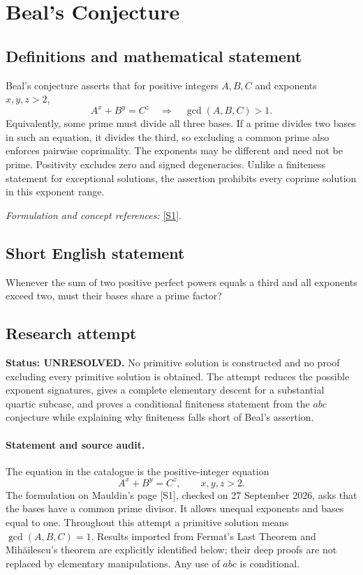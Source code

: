 \documentclass[11pt]{article}
\begin{document}
\section*{\texorpdfstring{Beal's Conjecture}{Beal's Conjecture}}\label{statement}
\subsection{Definitions and mathematical statement}
Beal's conjecture asserts that for positive integers $A,B,C$ and exponents $x,y,z>2$,
\[
 A^x+B^y=C^z\quad\Longrightarrow\quad\gcd(A,B,C)>1.
\]
Equivalently, some prime must divide all three bases. If a prime divides two bases in such an equation, it divides the third, so excluding a common prime also enforces pairwise coprimality. The exponents may be different and need not be prime. Positivity excludes zero and signed degeneracies. Unlike a finiteness statement for exceptional solutions, the assertion prohibits every coprime solution in this exponent range.
\par\smallskip\textit{Formulation and concept references:} \href{https://sites.math.unt.edu/~mauldin/beal.html}{[S1]}.

\subsection{Short English statement}
Whenever the sum of two positive perfect powers equals a third and all exponents exceed two, must their bases share a prime factor?
\subsection{Research attempt}
\textbf{Status: UNRESOLVED.} No primitive solution is constructed and no proof excluding every primitive solution is obtained. The attempt reduces the possible exponent signatures, gives a complete elementary descent for a substantial quartic subcase, and proves a conditional finiteness statement from the $abc$ conjecture while explaining why finiteness falls short of Beal's assertion.

\paragraph{Statement and source audit.}
The equation in the catalogue is the positive-integer equation
\[
 A^x+B^y=C^z,\qquad x,y,z>2.
\]
The formulation on Mauldin's page [S1], checked on 27 September 2026, asks that the bases have a common prime divisor. It allows unequal exponents and bases equal to one. Throughout this attempt a primitive solution means $\gcd(A,B,C)=1$. Results imported from Fermat's Last Theorem and Mih\u{a}ilescu's theorem are explicitly identified below; their deep proofs are not replaced by elementary manipulations. Any use of $abc$ is conditional.
\end{document}
